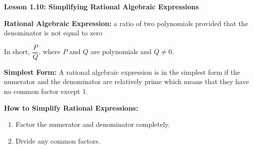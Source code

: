 \begin{center}
\textbf{Lesson 1.10: Simplifying Rational Algebraic Expressions}
\end{center}

\vspace*{-1ex}

\textbf{Rational Algebraic Expression: } a ratio of two polynomials provided that the denominator is not equal to zero 
 
In short, $\dfrac{P}{Q}$, where $P$ and $Q$ are polynomials and $Q \neq 0$.   

\textbf{Simplest Form:} A rational algebraic expression is in the simplest form if the numerator and the denominator are relatively prime which means that they have no common factor except 1.
		
\textbf{How to Simplify Rational Expressions:}
\begin{enumerate}
\item Factor the numerator and denominator completely. 
\item Divide any common factors.
\end{enumerate}
